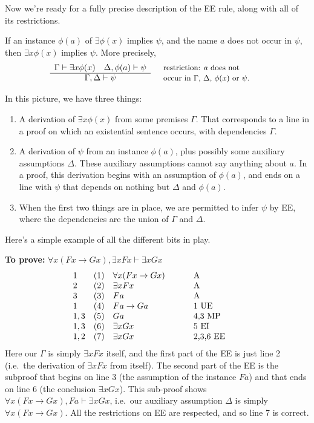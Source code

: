 Now we're ready for a fully precise description of the EE rule, along
with all of its restrictions.
\bigskip \begin{tcolorbox}[enhanced,width=11cm,title=Existential Elimination (EE),attach boxed title to top
  left={yshift=-2mm,xshift=4mm},boxed title style={sharp corners}]
  If an instance $\phi (a)$ of $\exists \phi (x)$ implies $\psi$, and the name $a$ does not occur in $\psi$, then $\exists x\phi (x)$ implies $\psi$.  More precisely, 
  \[ \begin{array}{c c@{\quad }p{4cm}}
       \Gamma \vdash \exists x\phi (x) \quad \Delta ,\phi (a) \vdash \psi & & \multirow{2}{4cm}{\small restriction: $a$ does not occur in $\Gamma$, $\Delta$, $\phi (x)$ or $\psi$.} \\ \cline{1-1}
       \Gamma ,\Delta \vdash \psi \end{array} \]
 \end{tcolorbox} \bigskip
 In this picture, we have three things:
 \begin{enumerate}
   \item A  derivation of $\exists
x\phi (x)$ from some premises $\Gamma$.  That corresponds to a line in
a proof on which an existential sentence occurs, with dependencies
$\Gamma$.
\item A derivation of $\psi$ from an instance $\phi (a)$, plus
  possibly some auxiliary assumptions $\Delta$.  These auxiliary
  assumptions cannot say anything about $a$.  In a proof, this
  derivation begins with an assumption of $\phi (a)$, and ends on a
  line with $\psi$ that depends on nothing but $\Delta$ and $\phi
  (a)$.
\item When the first two things are in place, we are permitted to
  infer $\psi$ by EE, where the dependencies are the union of $\Gamma$
  and $\Delta$. \end{enumerate}

Here's a simple example of all the different bits in play.

\medskip\noindent \textbf{To prove:} $\forall x(Fx\to Gx),\exists
xFx\vdash\exists xGx$
\[ \begin{array}{l l >{$}p{3cm}<{$} p{2cm}}
     1 & (1) & \forall x(Fx\to Gx) & A \\
     2 & (2) & \exists xFx         & A \\
     3 & (3) & Fa & A \\
     1 & (4) & Fa\to Ga & 1 UE \\
     1,3 & (5) & Ga     & 4,3 MP \\
     1,3 & (6) & \exists xGx & 5 EI \\
     1,2 & (7) & \exists xGx & 2,3,6 EE \end{array} \] Here our
$\Gamma$ is simply $\exists xFx$ itself, and the first part of the EE
is just line 2 (i.e.\ the derivation of $\exists xFx$ from itself).
The second part of the EE is the subproof that begins on line 3 (the
assumption of the instance $Fa$) and that ends on line 6 (the
conclusion $\exists xGx$).  This sub-proof shows $\forall x(Fx\to
Gx),Fa\vdash\exists xGx$, i.e.\ our auxiliary assumption $\Delta$
is simply $\forall x(Fx\to Gx)$.  All the restrictions on EE
are respected, and so line 7 is correct.

